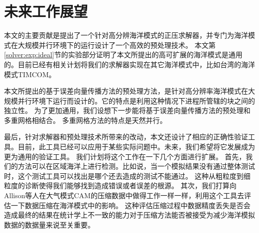 \section{未来工作展望}
\label{sec:futurework}

本文的主要贡献是提出了一个针对高分辨海洋模式的正压求解器，并专门为海洋模式在大规模并行环境下的运行设计了一个高效的预处理技术。
本文第\ref{solver:exp:ideal}节的实验部分证明了本文所提出的高可扩展的海洋模式是通用的。目前已经有相关计划将我们的求解器实现在其它海洋模式中，比如台湾的海洋模式TIMCOM\cite{tseng2011parallel}。 

本文所提出的基于误差向量传播方法的预处理方法，是针对高分辨率海洋模式在大规模并行环境下运行而设计的。它的特点是利用这种情况下进程所管辖的块之间的独立性。 为了更加通用，我们设想下一步能将基于误差向量传播方法的预处理和多重网格相结合。 
多重网格方法的特点是天然并行。 


最后，针对求解器和预处理技术所带来的改动，本文还设计了相应的正确性验证工具。目前，此工具已经可以应用于某些实际问题中。未来，我们希望将它发展成为更为通用的验证工具。 
我们计划将这个工作在一下几个方面进行扩展。 首先，我们的方法可以在区域海洋上进行检测。比如说，当一个模拟结果没有通过整体测试时，这个测试工具可以找出是哪个还去造成的测试不能通过。 
这种从粗粒度到细粒度的诊断使得我们能够找到造成错误或者误差的根源。 
其次，我们打算向Allison等人在大气模式CAM的压缩数据中做得工作一样\cite{baker2014methodology}一样，利用这个工具去评估一下数据压缩在海洋模式中的影响。
这种评估压缩过程中数据精度丢失是否会造成最终的结果在统计学上不一致的能力对于压缩方法能否被接受为减少海洋模拟数据的数据量来说至关重要。 



